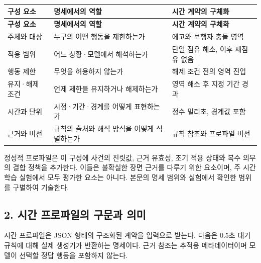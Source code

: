 \documentclass[11pt,a4paper]{article}
\begin{document}
\begingroup\small
\begin{longtable}{@{}>{\raggedright\arraybackslash}p{}>{\raggedright\arraybackslash}p{}>{\raggedright\arraybackslash}p{}@{}}
\toprule
\textbf{구성 요소} & \textbf{명세에서의 역할} & \textbf{시간 계약의 구체화} \\
\midrule\endfirsthead
\toprule
\textbf{구성 요소} & \textbf{명세에서의 역할} & \textbf{시간 계약의 구체화} \\
\midrule\endhead
\bottomrule\endfoot
주체와 대상 & 누구의 어떤 행동을 제한하는가 & 에고와 보행자 충돌 영역 \\
적용 범위 & 어느 상황·모델에서 해석하는가 & 단일 점유 해소, 이후 재점유 없음 \\
행동 제한 & 무엇을 허용하지 않는가 & 해제 조건 전의 영역 진입 \\
유지·해제 조건 & 언제 제한을 유지하거나 해제하는가 & 영역 해소 후 지정 기간 경과 \\
시간과 단위 & 시점·기간·경계를 어떻게 표현하는가 & 정수 밀리초, 경계값 포함 \\
근거와 버전 & 규칙의 출처와 해석 방식을 어떻게 식별하는가 & 규칙 참조와 프로파일 버전 \\
\end{longtable}
\endgroup

정성적 프로파일은 이 구성에 사건의 진릿값, 근거 유효성, 초기 적용 상태와 복수 의무의 결합 정책을 추가한다. 이들은 불확실한 장면 근거를 다루기 위한 요소이며, 주 시간 학습 실험에서 모두 평가한 요소는 아니다. 본문의 명세 범위와 실험에서 확인한 범위를 구별하여 기술한다.\par

\subsection*{2. 시간 프로파일의 구문과 의미}

시간 프로파일은 JSON 형태의 구조화된 계약을 입력으로 받는다. 다음은 0.5초 대기 규칙에 대해 실제 생성기가 반환하는 명세이다. 근거 참조는 추적용 메타데이터이며 모델이 선택할 정답 행동을 포함하지 않는다.\par
\end{document}
